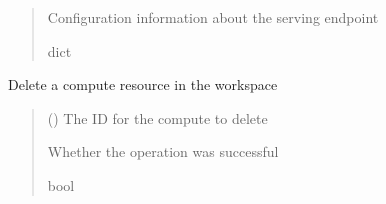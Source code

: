 \documentclass[letterpaper,10pt,english]{sphinxmanual}
\begin{document}
\begin{fulllineitems}
\begin{fulllineitems}
\begin{quote}
\begin{description}
\begin{itemize}
\end{itemize}

\sphinxAtStartPar
{} \textendash{} Configuration information about the serving endpoint

\sphinxAtStartPar
dict

\end{description}\end{quote}

\end{fulllineitems}


\begin{fulllineitems}
\label{\detokenize{aisquared.platform:aisquared.platform.DatabricksClient.DatabricksClient.delete_compute}}
\pysigstartsignatures
{}
\pysigstopsignatures
\sphinxAtStartPar
Delete a compute resource in the workspace
\begin{quote}\begin{description}
\sphinxAtStartPar
{} () \textendash{} The ID for the compute to delete

\sphinxAtStartPar
{} \textendash{} Whether the operation was successful

\sphinxAtStartPar
bool

\end{description}\end{quote}

\end{fulllineitems}



\end{fulllineitems}
\end{document}
